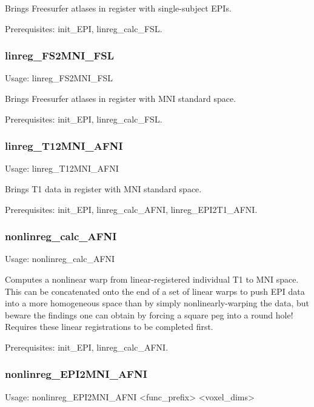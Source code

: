 \documentclass[final,titlepage,letterpaper,oneside,12pt]{article}
\renewcommand{\texttt}[2][BrickRed]{\textcolor{#1}{\ttfamily #2}}%
\begin{document}
\noindent Brings Freesurfer atlases in register with single-subject EPIs.

Prerequisites: \texttt{init\_EPI}, \texttt{linreg\_calc\_FSL}.

\subsubsection{linreg\_FS2MNI\_FSL}
Usage: \texttt{linreg\_FS2MNI\_FSL}

\noindent Brings Freesurfer atlases in register with MNI standard space.

Prerequisites: \texttt{init\_EPI}, \texttt{linreg\_calc\_FSL}.


\subsubsection{linreg\_T12MNI\_AFNI}
Usage: \texttt{linreg\_T12MNI\_AFNI}

\noindent Brings T1 data in register with MNI standard space.

Prerequisites: \texttt{init\_EPI}, \texttt{linreg\_calc\_AFNI}, \texttt{linreg\_EPI2T1\_AFNI}.

\subsubsection{nonlinreg\_calc\_AFNI}
Usage: \texttt{nonlinreg\_calc\_AFNI}

\noindent Computes a nonlinear warp from linear-registered individual T1 to MNI space. This can be concatenated onto the end of a set of linear warps to push EPI data into a more homogeneous space than by simply nonlinearly-warping the data, but beware the findings one can obtain by forcing a square peg into a round hole! Requires these linear registrations to be completed first.

Prerequisites: \texttt{init\_EPI}, \texttt{linreg\_calc\_AFNI}.

\subsubsection{nonlinreg\_EPI2MNI\_AFNI}
Usage: \texttt{nonlinreg\_EPI2MNI\_AFNI <func\_prefix> <voxel\_dims>}
\end{document}
